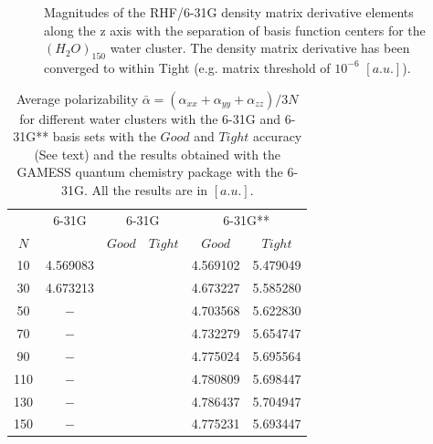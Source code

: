 \documentclass[twocolumn,showpacs,preprintnumbers,amsmath,amssymb]{revtex4}
\begin{document}
\begin{figure}
  \centering
  \caption{\protect
    Magnitudes of the RHF/6-31G density matrix derivative elements 
    along the z axis with the separation of basis function centers
    for the $(H_2O)_{150}$ water cluster. The density matrix 
    derivative has been converged to within Tight (e.g. 
    matrix threshold of $10^{-6}$ $[a.u.]$).
  }\label{fig:DPrimeZ_150_6-31G}
  \begin{center}
  \end{center}
\end{figure}
\begin{table}
  \centering
  \caption{\protect
    Average polarizability $\bar{\alpha}=(\alpha_{xx}+\alpha_{yy}+\alpha_{zz})/3N$
    for different water clusters with the 6-31G and 6-31G** basis sets
    with the $Good$ and $Tight$ accuracy (See text) and the results obtained with
    the GAMESS quantum chemistry package \cite{gamess} with the 6-31G. 
    All the results are in $[a.u.]$.
  }\label{tab:Polari_Values}
    \begin{tabular}{cccccc}
      &\multicolumn{1}{c}{6-31G\footnotemark[1]}
      &\multicolumn{2}{c}{6-31G\footnotemark[2]}
      &\multicolumn{2}{c}{6-31G**\footnotemark[2]}\\
      $N$ & & $Good$ & $Tight$
          & $Good$ & $Tight$\\
      \hline
      10  & 4.569083 &  &  & 4.569102 & 5.479049  \\
      30  & 4.673213 &  &  & 4.673227 & 5.585280  \\
      50  & $-$      &  &  & 4.703568 & 5.622830  \\
      70  & $-$      &  &  & 4.732279 & 5.654747  \\
      90  & $-$      &  &  & 4.775024 & 5.695564  \\
      110 & $-$      &  &  & 4.780809 & 5.698447  \\
      130 & $-$      &  &  & 4.786437 & 5.704947  \\
      150 & $-$      &  &  & 4.775231 & 5.693447  \\
    \end{tabular}
\end{table}
\end{document}
